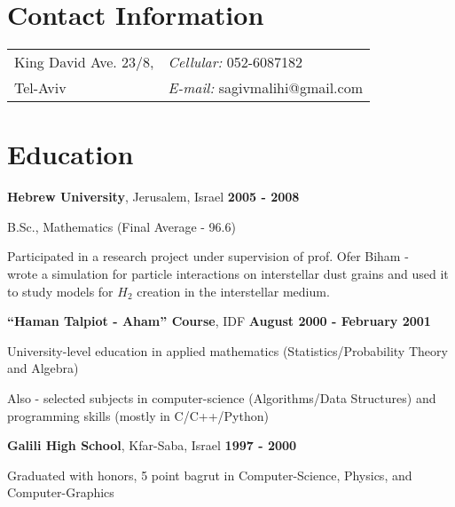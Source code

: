\documentclass[margin,line]{res}
\newenvironment{list1}{
  \begin{list}{\ding{113}}{%
      \setlength{\itemsep}{0in}
      \setlength{\parsep}{0in} \setlength{\parskip}{0in}
      \setlength{\topsep}{0in} \setlength{\partopsep}{0in} 
      \setlength{\leftmargin}{0.2in}}}{\end{list}}
\begin{document}

\begin{resume}
\section{\sc Contact Information}
\vspace{.05in}
\begin{tabular}{@{}p{2in}p{4in}}
King David Ave. 23/8,       & {\it Cellular:}  052-6087182 \\
Tel-Aviv           & {\it E-mail:}  sagivmalihi@gmail.com \\
\end{tabular}

\section{\sc Education}
{\bf Hebrew University}, Jerusalem, Israel \hfill {\bf 2005 - 2008} \\
\vspace*{-.1in}
\begin{list1}
\item[] B.Sc., Mathematics (Final Average - 96.6)
\item[] Participated in a research project under supervision of prof. Ofer Biham - \\ 
        wrote a simulation for particle interactions on interstellar dust grains 
        and used it to study models for $H_2$ creation in the interstellar medium.
\end{list1}

{\bf ``Haman Talpiot - Aham'' Course}, IDF \hfill {\bf August 2000 - February 2001}\\
\vspace*{-.1in}
\begin{list1}
\item[] University-level education in applied mathematics (Statistics/Probability Theory and Algebra)
\item[] Also - selected subjects in computer-science (Algorithms/Data Structures) and programming skills (mostly in C/C++/Python)
\end{list1}

{\bf Galili High School}, Kfar-Saba, Israel \hfill {\bf 1997 - 2000}\\
\vspace*{-.1in}
\begin{list1}
\item[] Graduated with honors, 5 point bagrut in Computer-Science, Physics, and Computer-Graphics
\end{list1}



\end{resume}
\end{document}
